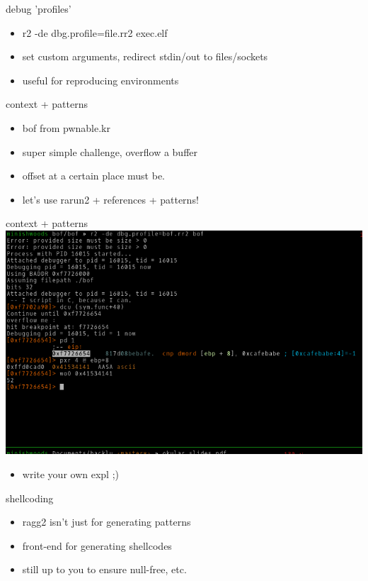 \documentclass[10pt,pdf,utf8,english,compress,hyperref={unicode}]{beamer}
\begin{document}
\begin{frame}{debug 'profiles'}
	\begin{itemize}
		\item r2 -de dbg.profile=file.rr2 exec.elf
		\item set custom arguments, redirect stdin/out to files/sockets
		\item useful for reproducing environments
	\end{itemize}
\end{frame}

\begin{frame}{context + patterns}
	\begin{itemize}
		\item bof from pwnable.kr
		\item super simple challenge, overflow a buffer
		\item offset at a certain place must be.
		\item let's use rarun2 + references + patterns!
	\end{itemize}
\end{frame}

\begin{frame}{context + patterns}
	\includegraphics[width=\textwidth]{crimages/bof1.png}
	\begin{itemize}
		\item write your own expl ;)
	\end{itemize}
\end{frame}


\begin{frame}{shellcoding}
	\begin{itemize}
		\item ragg2 isn't just for generating patterns
		\item front-end for generating shellcodes
		\item still up to you to ensure null-free, etc.
	\end{itemize}
\end{frame}
\end{document}
